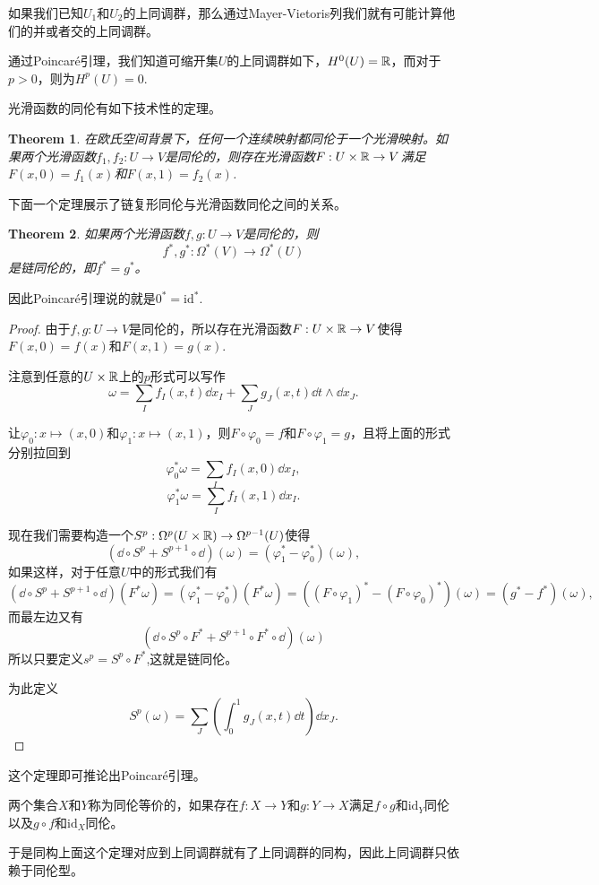 \documentclass[8pt]{book}
\theoremstyle{plain}%
\newtheorem{theo}{Theorem}[section]%
\begin{document}
如果我们已知$U_1$和$U_2$的上同调群，那么通过Mayer-Vietoris列我们就有可能计算他们的并或者交的上同调群。

通过Poincaré引理，我们知道可缩开集$U$的上同调群如下，$H^0(U)=\mathbb{R}$，而对于$p>0$，则为$H^p(U)=0$.

光滑函数的同伦有如下技术性的定理。
\begin{theo}
在欧氏空间背景下，任何一个连续映射都同伦于一个光滑映射。如果两个光滑函数$f_1,f_2:U\to V$是同伦的，则存在光滑函数$F:U\times \mathbb{R}\to V$满足$F(x,0)=f_1(x)$和$F(x,1)=f_2(x)$.
\end{theo}

下面一个定理展示了链复形同伦与光滑函数同伦之间的关系。
\begin{theo}
如果两个光滑函数$f,g:U\to V$是同伦的，则
\[
f^*,g^*:\Omega^*(V)\to \Omega^*(U)
\]
是链同伦的，即$f^*=g^*$。
\end{theo}
因此Poincaré引理说的就是$0^*=\mathrm{id}^*$.
\begin{proof}
由于$f,g:U\to V$是同伦的，所以存在光滑函数$F:U\times \mathbb{R} \to V$使得$F(x,0)=f(x)$和$F(x,1)=g(x)$.

注意到任意的$U\times \mathbb{R}$上的$p$形式可以写作
\[
\omega=\sum_If_I(x,t)\dd x_I+\sum_J g_J(x,t)\dd t\wedge \dd x_J.
\]

让$\varphi_0:x\mapsto (x,0)$和$\varphi_1:x\mapsto (x,1)$，则$F\circ \varphi_0=f$和$F\circ \varphi_1=g$，且将上面的形式分别拉回到
\[
\varphi_0^*\omega=\sum_I f_I(x,0)\dd x_I,
\]
\[
\varphi_1^*\omega=\sum_I f_I(x,1)\dd x_I.
\]

现在我们需要构造一个$S^p:\Omega^p(U\times \mathbb{R})\to \Omega^{p-1}(U)$使得
\[
(\dd \circ S^p+S^{p+1}\circ \dd)(\omega)=(\varphi_1^*-\varphi_0^*)(\omega),
\]
如果这样，对于任意$U$中的形式我们有
\[
(\dd \circ S^p+S^{p+1}\circ \dd)(F^*\omega)=(\varphi_1^*-\varphi_0^*)(F^*\omega)=((F\circ \varphi_1)^*-(F\circ \varphi_0)^*)(\omega)=(g^*-f^*)(\omega),
\]
而最左边又有
\[
(\dd \circ S^p\circ F^*+S^{p+1}\circ F^* \circ \dd)(\omega)
\]
所以只要定义$s^p=S^p\circ F^*$,这就是链同伦。

为此定义
\[
S^p(\omega)=\sum_J\left(\int_0^1g_J(x,t)\dd t\right)\dd x_J.
\]
\end{proof}

这个定理即可推论出Poincaré引理。

两个集合$X$和$Y$称为同伦等价的，如果存在$f:X\to Y$和$g:Y\to X$满足$f\circ g$和$\mathrm{id}_Y$同伦以及$g\circ f$和$\mathrm{id}_X$同伦。

于是同构上面这个定理对应到上同调群就有了上同调群的同构，因此上同调群只依赖于同伦型。
\end{document}
